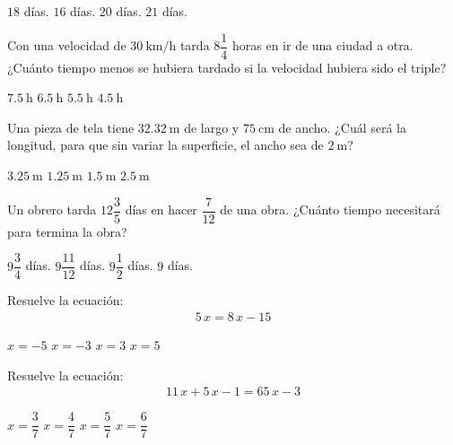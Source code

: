 \documentclass[12pt]{exam}
\begin{document}
\begin{multicols}{2}
\begin{questions}
     \begin{choices}
        \choice $18$ días.
        \choice $16$ días.
        \choice $20$ días.
        \choice $21$ días.
    \end{choices}
    \question Con una velocidad de $\SI[per-mode=symbol]{30}{\kilo\meter\per\hour}$ tarda $8 \dfrac{1}{4}$ horas en ir de una ciudad a otra. ¿Cuánto tiempo menos se hubiera tardado si la velocidad hubiera sido el triple?
     \begin{choices}
        \choice $\SI{7.5}{\hour}$ 
        \choice $\SI{6.5}{\hour}$ 
        \choice $\SI{5.5}{\hour}$ 
        \choice $\SI{4.5}{\hour}$
    \end{choices}
    \question Una pieza de tela tiene $\SI{32.32}{\meter}$ de largo y $\SI{75}{\centi\meter}$ de ancho. ¿Cuál será la longitud, para que sin variar la superficie, el ancho sea de $\SI{2}{\meter}$?
     \begin{choices}
        \choice $\SI{3.25}{\meter}$ 
        \choice $\SI{1.25}{\meter}$ 
        \choice $\SI{1.5}{\meter}$ 
        \choice $\SI{2.5}{\meter}$
    \end{choices}
    \newpage
    \question Un obrero tarda $12 \dfrac{3}{5}$ días en hacer $\dfrac{7}{12}$ de una obra. ¿Cuánto tiempo necesitará para termina la obra?
     \begin{choices}
        \choice $9 \dfrac{3}{4}$ días. 
        \choice $9 \dfrac{11}{12}$ días. 
        \choice $9 \dfrac{1}{2}$ días. 
        \choice $9$ días.
    \end{choices}
    \question Resuelve la ecuación:
    \begingroup
    \abovedisplayskip=0pt
    \belowdisplayskip=-10pt
    \begin{align*}
    5 \, x = 8 \, x - 15
    \end{align*}
    \endgroup
    \begin{choices}
        \choice $x = -5$
        \choice $x = -3$
        \choice $x = 3$
        \choice $x = 5$
    \end{choices}
    \question Resuelve la ecuación:
    \begingroup
    \abovedisplayskip=0pt
    \belowdisplayskip=-10pt
    \begin{align*}
    11 \, x + 5 \, x - 1 = 65 \, x - 3
    \end{align*}
    \endgroup
    \begin{choices}
        \choice $x = \dfrac{3}{7}$
        \choice $x = \dfrac{4}{7}$
        \choice $x = \dfrac{5}{7}$
        \choice $x = \dfrac{6}{7}$

\end{choices}
\end{questions}
\end{multicols}
\end{document}
